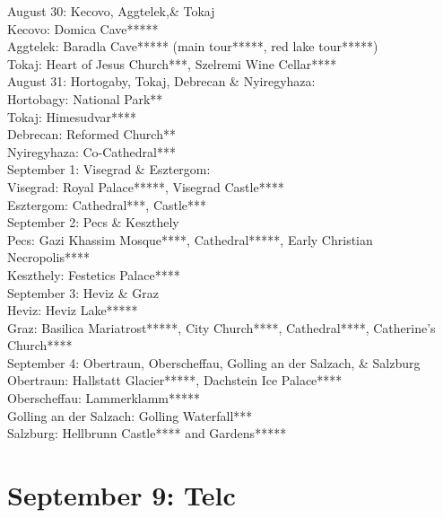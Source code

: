 August 30: Kecovo, Aggtelek,\& Tokaj\\

Kecovo: Domica Cave*****\\
Aggtelek: Baradla Cave***** (main tour*****, red lake tour*****)\\
Tokaj: Heart of Jesus Church***, Szelremi Wine Cellar****\\

August 31: Hortogaby, Tokaj, Debrecan \& Nyiregyhaza:\\

Hortobagy: National Park**\\
Tokaj: Himesudvar****\\
Debrecan: Reformed Church**\\
Nyiregyhaza: Co-Cathedral***\\

September 1: Visegrad \& Esztergom:\\

Visegrad: Royal Palace*****, Visegrad Castle****\\
Esztergom: Cathedral***, Castle***\\

September 2: Pecs \& Keszthely\\

Pecs:  Gazi Khassim Mosque****, Cathedral*****, Early Christian Necropolis****\\
Keszthely: Festetics Palace****\\


September 3: Heviz \& Graz\\

Heviz: Heviz Lake*****\\
Graz: Basilica Mariatrost*****, City Church****, Cathedral****, Catherine's Church****\\

September 4: Obertraun, Oberscheffau, Golling an der Salzach, \& Salzburg\\

Obertraun: Hallstatt Glacier*****, Dachstein Ice Palace****\\
Oberscheffau: Lammerklamm*****\\
Golling an der Salzach: Golling Waterfall***\\
Salzburg: Hellbrunn Castle**** and Gardens*****\\

\section{September 9: Telc}
\label{2023:Telc}

